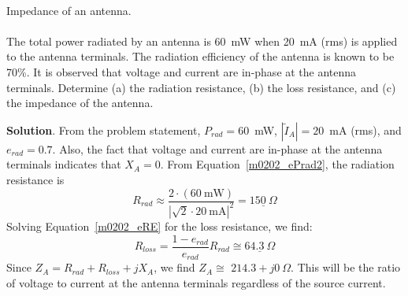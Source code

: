 ~\\ \begin{example} 
\begin{mdframed}[backgroundcolor=brown!20,linecolor=brown!20]\raggedright
Impedance of an antenna. 
\\~\\
The total power radiated by an antenna is 60~mW when 20~mA (rms) is applied to the antenna terminals.  
The radiation efficiency of the antenna is known to be 70\%.
It is observed that voltage and current are in-phase at the antenna terminals.
Determine (a) the radiation resistance, (b) the loss resistance, and (c) the impedance of the antenna.

{\bf Solution}.
From the problem statement, $P_{rad}=60$~mW, $\left|\widetilde{I}_A\right|=20$~mA (rms), and $e_{rad}=0.7$.
Also, the fact that voltage and current are in-phase at the antenna terminals indicates that $X_A=0$.
From Equation~\ref{m0202_ePrad2}, the radiation resistance is
%
\begin{equation}
R_{rad} \approx \frac{2\cdot\left(60~\mbox{mW}\right)}{\left|\sqrt{2}\cdot 20~\mbox{mA}\right|^2} = \underline{150~\Omega}
\end{equation}
%
Solving Equation~\ref{m0202_eRE} for the loss resistance, we find:
%
\begin{equation}
R_{loss} = \frac{1-e_{rad}}{e_{rad}}R_{rad} \cong \underline{64.3~\Omega}
\end{equation}
%
Since $Z_A=R_{rad}+R_{loss}+jX_A$, we find $Z_A\cong$ \underline{$214.3+j0~\Omega$}.
This will be the ratio of voltage to current at the antenna terminals regardless of the source current.
\end{mdframed}
\end{example}

